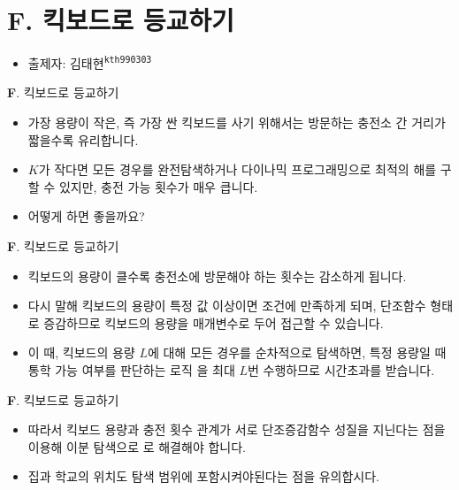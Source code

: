 \section{F. 킥보드로 등교하기}

\begin{frame} %
    \begin{itemize}
        \item 출제자: 김태현\textsuperscript{\color{kupc-gray}\texttt{kth990303}}
    \end{itemize}
\end{frame}

\begin{frame}{\textbf{F}. 킥보드로 등교하기}
    \begin{itemize}
        \item 가장 용량이 작은, 즉 가장 싼 킥보드를 사기 위해서는 방문하는 충전소 간 거리가 짧을수록 유리합니다. 
        \item $K$가 작다면 모든 경우를 완전탐색하거나 다이나믹 프로그래밍으로 최적의 해를 구할 수 있지만, 충전 가능 횟수가 매우 큽니다.
        \item 어떻게 하면 좋을까요?
    \end{itemize}
\end{frame}

\begin{frame}{\textbf{F}. 킥보드로 등교하기}
    \begin{itemize}
        \item 킥보드의 용량이 클수록 충전소에 방문해야 하는 횟수는 감소하게 됩니다. 
        \item 다시 말해 킥보드의 용량이 특정 값 이상이면 조건에 만족하게 되며, 단조함수 형태로 증감하므로 킥보드의 용량을 매개변수로 두어 접근할 수 있습니다.
        \item 이 때, 킥보드의 용량 $L$에 대해 모든 경우를 순차적으로 탐색하면, 특정 용량일 때 통학 가능 여부를 판단하는 로직 을 최대 $L$번 수행하므로 시간초과를 받습니다.
    \end{itemize}
\end{frame}

\begin{frame}{\textbf{F}. 킥보드로 등교하기}
    \begin{itemize}
        \item 따라서 킥보드 용량과 충전 횟수 관계가 서로 단조증감함수 성질을 지닌다는 점을 이용해 이분 탐색으로 로 해결해야 합니다.
        \item 집과 학교의 위치도 탐색 범위에 포함시켜야된다는 점을 유의합시다.
    \end{itemize}
\end{frame}